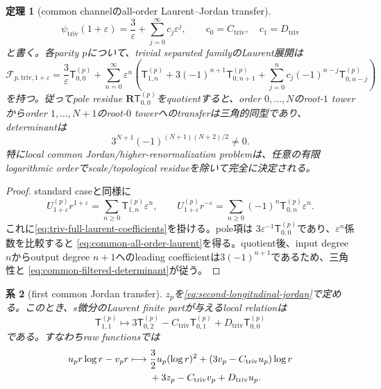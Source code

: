 \documentclass[11pt,a4paper]{ltjsarticle}
\newtheorem{theorem}{定理}[section]
\newtheorem{corollary}[theorem]{系}
\theoremstyle{definition}
\theoremstyle{remark}
\newcommand{\RR}{\mathbf R}
\newcommand{\eps}{\varepsilon}
\begin{document}
\begin{theorem}[common channelのall-order Laurent--Jordan transfer]
\label{thm:common-filtered-transfer}
\begin{equation}\label{eq:triv-full-laurent-coefficients}
 \psi_{\mathrm{triv}}(1+\eps)
 =\frac3\eps+\sum_{j=0}^{\infty}c_j\eps^j,
 \qquad
 c_0=C_{\mathrm{triv}},\quad
 c_1=D_{\mathrm{triv}}
\end{equation}
と書く。各parity $p$について、trivial separated familyのLaurent展開は
\begin{equation}\label{eq:common-all-order-laurent}
 \mathcal F_{p,\mathrm{triv},1+\eps}
 =\frac3\eps\mathsf T_{0,0}^{(p)}
 +\sum_{n=0}^{\infty}\eps^n
 \left(
 \mathsf T_{1,n}^{(p)}
 +3(-1)^{n+1}\mathsf T_{0,n+1}^{(p)}
 +\sum_{j=0}^{n}c_j(-1)^{n-j}
  \mathsf T_{0,n-j}^{(p)}
 \right)
\end{equation}
を持つ。従ってpole residue
$\RR\mathsf T_{0,0}^{(p)}$をquotientすると、order $0,\ldots,N$のroot-$1$ towerからorder $1,\ldots,N+1$のroot-$0$ towerへのtransferは三角的同型であり、determinantは
\begin{equation}\label{eq:common-filtered-determinant}
 \boxed{
 3^{N+1}(-1)^{(N+1)(N+2)/2}\ne0.
 }
\end{equation}
特にlocal common Jordan/higher-renormalization problemは、任意の有限logarithmic orderでscale/topological residueを除いて完全に決定される。
\end{theorem}

\begin{proof}
standard caseと同様に
\[
 U_{1+\eps}^{(p)}r^{1+\eps}
 =\sum_{n\ge0}\mathsf T_{1,n}^{(p)}\eps^n,
 \qquad
 U_{1+\eps}^{(p)}r^{-\eps}
 =\sum_{n\ge0}(-1)^n
 \mathsf T_{0,n}^{(p)}\eps^n.
\]
これに\eqref{eq:triv-full-laurent-coefficients}を掛ける。pole項は
$3\eps^{-1}\mathsf T_{0,0}^{(p)}$であり、$\eps^n$係数を比較すると
\eqref{eq:common-all-order-laurent}を得る。quotient後、input degree $n$からoutput degree $n+1$へのleading coefficientは$3(-1)^{n+1}$であるため、三角性と
\eqref{eq:common-filtered-determinant}が従う。
\end{proof}

\begin{corollary}[first common Jordan transfer]\label{cor:first-common-jordan-transfer}
$z_p$を\eqref{eq:second-longitudinal-jordan}で定める。このとき、$s$微分のLaurent finite partが与えるlocal relationは
\begin{equation}\label{eq:first-common-jordan-tower}
 \boxed{
 \mathsf T_{1,1}^{(p)}\longmapsto
 3\mathsf T_{0,2}^{(p)}
 -C_{\mathrm{triv}}\mathsf T_{0,1}^{(p)}
 +D_{\mathrm{triv}}\mathsf T_{0,0}^{(p)}
 }
\end{equation}
である。すなわちraw functionsでは
\begin{align}
 u_pr\log r-v_pr
 \longmapsto{}&
 \frac32u_p(\log r)^2
 +(3v_p-C_{\mathrm{triv}}u_p)\log r
 \notag\\
 &+3z_p-C_{\mathrm{triv}}v_p
 +D_{\mathrm{triv}}u_p.
 \label{eq:first-common-jordan-raw}
\end{align}
\end{corollary}
\end{document}
